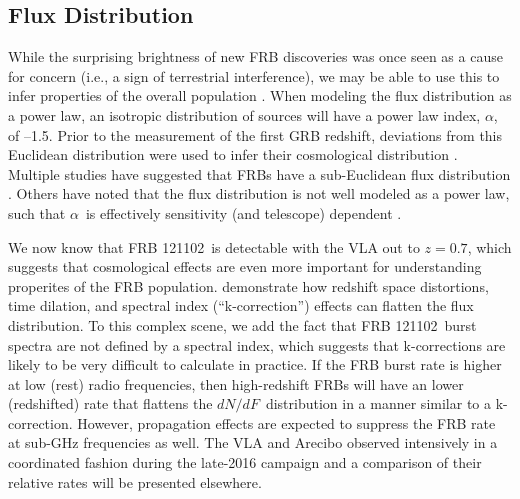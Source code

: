 \documentclass[twocolumn]{aastex61}
\newcommand{\frb}{FRB 121102}
\begin{document}
\subsection{Flux Distribution}

While the surprising brightness of new FRB discoveries was once seen as a cause for concern (i.e., a sign of terrestrial interference), we may be able to use this to infer properties of the overall population \citep{2007Sci...318..777L, 2016arXiv161105758R}. When modeling the flux distribution as a power law, an isotropic distribution of sources will have a power law index, $\alpha$, of --1.5. Prior to the measurement of the first GRB redshift, deviations from this Euclidean distribution were used to infer their cosmological distribution \citep[e.g., the $V/V_{\rm{max}}$\ test;][]{1992ApJ...388L..45M, 1995ApJ...453...25F}. Multiple studies have suggested that FRBs have a sub-Euclidean flux distribution \citep[$-0.5<\alpha<-0.9$;][]{2016ApJ...830...75V, 2016arXiv160206099L, 2016arXiv161100458L}. Others have noted that the flux distribution is not well modeled as a power law, such that $\alpha$\ is effectively sensitivity (and telescope) dependent \citep{2016MNRAS.461..984O, 2017arXiv170208040C}.

We now know that \frb\ is detectable with the VLA out to $z=0.7$, which suggests that cosmological effects are even more important for understanding properites of the FRB population. \citet{2017arXiv170208040C} demonstrate how redshift space distortions, time dilation, and spectral index (``k-correction'') effects can flatten the flux distribution. To this complex scene, we add the fact that \frb\ burst spectra are not defined by a spectral index, which suggests that k-corrections are likely to be very difficult to calculate in practice. If the FRB burst rate is higher at low (rest) radio frequencies, then high-redshift FRBs will have an lower (redshifted) rate that flattens the $dN/dF$\ distribution in a manner similar to a k-correction. However, propagation effects are expected to suppress the FRB rate at sub-GHz frequencies \citep{2017MNRAS.465.2286R, 2017arXiv170107457C} as well. The VLA and Arecibo observed intensively in a coordinated fashion during the late-2016 campaign and a comparison of their relative rates will be presented elsewhere. 
\end{document}
